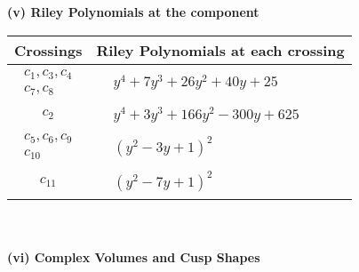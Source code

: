 \documentclass[1p]{elsarticle_modified}
\theoremstyle{definition}
\begin{document}
\newpage\renewcommand{\arraystretch}{1}
\flushleft \textbf{(v) Riley Polynomials at the component}\newline \\
\begin{tabular}{m{50pt}|m{274pt}}
Crossings & \hspace{64pt}Riley Polynomials at each crossing \\
\hline $$\begin{aligned}c_{1},c_{3},c_{4}\\c_{7},c_{8}\end{aligned}$$&$\begin{aligned}
&y^4+7 y^3+26 y^2+40 y+25
\end{aligned}$\\
\hline $$\begin{aligned}c_{2}\end{aligned}$$&$\begin{aligned}
&y^4+3 y^3+166 y^2-300 y+625
\end{aligned}$\\
\hline $$\begin{aligned}c_{5},c_{6},c_{9}\\c_{10}\end{aligned}$$&$\begin{aligned}
&(y^2-3 y+1)^2
\end{aligned}$\\
\hline $$\begin{aligned}c_{11}\end{aligned}$$&$\begin{aligned}
&(y^2-7 y+1)^2
\end{aligned}$\\
\hline
\end{tabular}\\~\\
\newpage\flushleft \textbf{(vi) Complex Volumes and Cusp Shapes}
\end{document}

